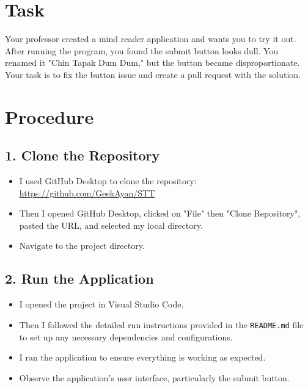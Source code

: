 \documentclass[a4paper,12pt]{article}
\begin{document}
\maketitle

\section*{Task}
Your professor created a mind reader application and wants you to try it out. After running the program, you found the submit button looks dull. You renamed it "Chin Tapak Dum Dum," but the button became disproportionate. Your task is to fix the button issue and create a pull request with the solution.

\section*{Procedure}

\subsection*{1. Clone the Repository}
\begin{itemize}
    \item I used GitHub Desktop to clone the repository:\\ 
    \url{https://github.com/GeekAyan/STT}
    \item Then I opened GitHub Desktop, clicked on "File" then "Clone Repository", pasted the URL, and selected my local directory.
    \item Navigate to the project directory.
\end{itemize}

\subsection*{2. Run the Application}
\begin{itemize}
    \item I opened the project in Visual Studio Code.
    \item Then I followed the detailed run instructions provided in the \texttt{README.md} file to set up any necessary dependencies and configurations.
    \item I ran the application to ensure everything is working as expected.
    \item Observe the application's user interface, particularly the submit button.
\end{itemize}
\end{document}
